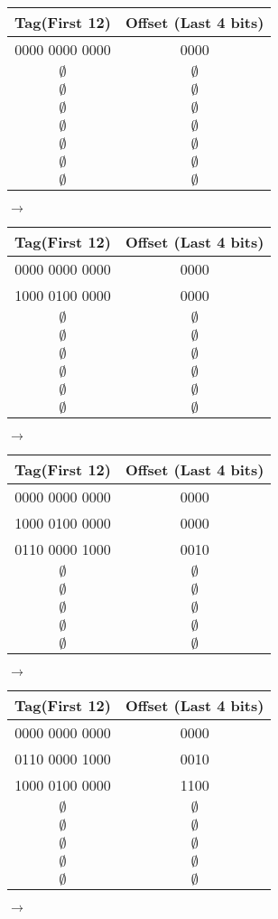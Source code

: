 \documentclass{exam}
\begin{document}
\begin{questions}
\begin{tabular}{c c}
\textbf{Tag(First 12)}&\textbf{Offset (Last 4 bits)}\\ [0.5ex]
\hline \hline
0000 0000 0000 &0000\\
$\emptyset$ & $\emptyset$\\
$\emptyset$ & $\emptyset$\\
$\emptyset$ & $\emptyset$\\
$\emptyset$ & $\emptyset$\\
$\emptyset$ & $\emptyset$\\
$\emptyset$ & $\emptyset$\\
$\emptyset$ & $\emptyset$\\
\end{tabular} $\rightarrow$
\begin{tabular}{c c}
\textbf{Tag(First 12)}&\textbf{Offset (Last 4 bits)}\\ [0.5ex]
\hline \hline
0000 0000 0000 &0000\\
1000 0100 0000 & 0000\\
$\emptyset$ & $\emptyset$\\
$\emptyset$ & $\emptyset$\\
$\emptyset$ & $\emptyset$\\
$\emptyset$ & $\emptyset$\\
$\emptyset$ & $\emptyset$\\
$\emptyset$ & $\emptyset$\\
\end{tabular} $\rightarrow$

\begin{tabular}{c c}
\textbf{Tag(First 12)}&\textbf{Offset (Last 4 bits)}\\ [0.5ex]
\hline \hline
0000 0000 0000 &0000\\
1000 0100 0000 & 0000\\
0110 0000 1000 & 0010\\
$\emptyset$ & $\emptyset$\\
$\emptyset$ & $\emptyset$\\
$\emptyset$ & $\emptyset$\\
$\emptyset$ & $\emptyset$\\
$\emptyset$ & $\emptyset$\\
\end{tabular} $\rightarrow$
\begin{tabular}{c c}
\textbf{Tag(First 12)}&\textbf{Offset (Last 4 bits)}\\ [0.5ex]
\hline \hline
0000 0000 0000 &0000\\
0110 0000 1000 & 0010\\
1000 0100 0000 & 1100\\
$\emptyset$ & $\emptyset$\\
$\emptyset$ & $\emptyset$\\
$\emptyset$ & $\emptyset$\\
$\emptyset$ & $\emptyset$\\
$\emptyset$ & $\emptyset$\\
\end{tabular} $\rightarrow$


\end{questions}
\end{document}
